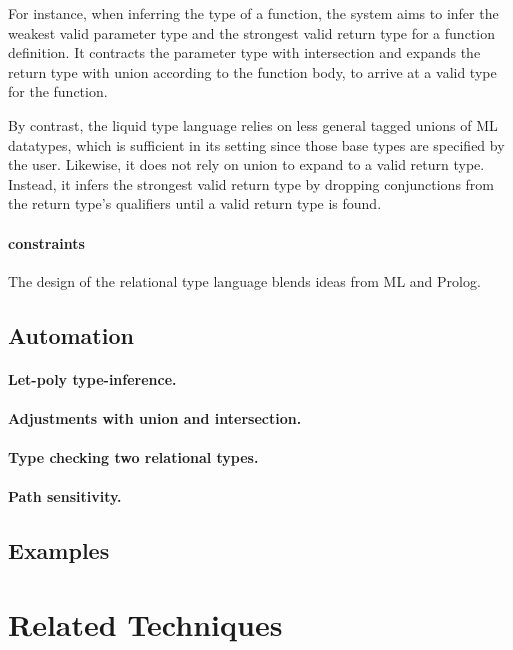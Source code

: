 \documentclass[letterpaper]{llncs}
\begin{document}
For instance, when inferring the type of a function, 
the system aims to infer the weakest valid parameter type and the strongest valid return type for a function definition.
It contracts the parameter type with intersection and expands the return type with union according to the function body,
to arrive at a valid type for the function.  

By contrast, the liquid type language relies on less general tagged unions of ML datatypes, 
which is sufficient in its setting since those base types are specified by the user. 
Likewise, it does not rely on union to expand to a valid return type. 
Instead, it infers the strongest valid return type by dropping conjunctions from 
the return type's qualifiers until a valid return type is found.


\paragraph{constraints}
The design of the relational type language blends ideas from ML and Prolog.

\subsection{Automation}
\paragraph{Let-poly type-inference.}
\paragraph{Adjustments with union and intersection.}
\paragraph{Type checking two relational types.}
\paragraph{Path sensitivity.}

\subsection{Examples}

\section{Related Techniques}
\end{document}
